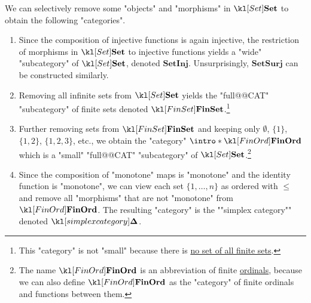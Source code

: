 \documentclass[main.tex]{subfiles}
\begin{document}
\begin{exmps}\label{exmp:subcatSet}
	We can selectively remove some "objects" and "morphisms" in $\catSet$ to obtain the following "categories".
	\begin{enumerate}
		\item Since the composition of injective functions is again injective, the restriction of morphisms in $\catSet$ to injective functions yields a "wide" "subcategory" of $\catSet$, denoted $\mathbf{SetInj}$. Unsurprisingly, $\mathbf{SetSurj}$ can be constructed similarly.
		\item Removing all infinite sets from $\catSet$ yields the "full@@CAT" "subcategory" of finite sets denoted $\catFinSet$.\footnote{This "category" is not "small" because there is \href{https://math.stackexchange.com/questions/896270/collection-of-all-finite-sets}{no set of all finite sets}.}
		\item Further removing sets from $\catFinSet$ and keeping only $\emptyset$, $\{1\}$, $\{1,2\}$, $\{1,2,3\}$, etc., we obtain the "category" $\intro*\catFinOrd$ which is a "small" "full@@CAT" "subcategory" of $\catSet$.\footnote{The name $\catFinOrd$ is an abbreviation of finite \href{https://en.wikipedia.org/wiki/Ordinal_number}{ordinals}, because we can also define $\catFinOrd$ as the "category" of finite ordinals and functions between them.}
		\item Since the composition of "monotone" maps is "monotone" and the identity function is "monotone", we can view each set $\{1,\dots, n\}$ as ordered with $\leq$ and remove all "morphisms" that are not "monotone" from $\catFinOrd$. The resulting "category" is the ""simplex category"" denoted $\catSimplex$.
	\end{enumerate}
\end{exmps}
\end{document}
